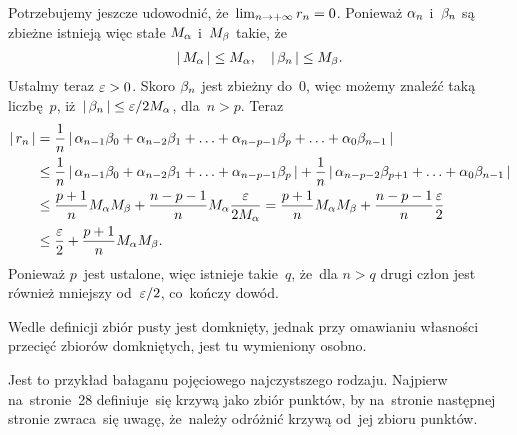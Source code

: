 \documentclass[a4paper,11pt]{article}
\begin{document}
\vspace{\spaceFour}


\start {} Potrzebujemy jeszcze udowodnić,
że~$\lim_{ n \to +\infty } r_{ n } = 0$. Ponieważ $\alpha_{ n }$
i~$\beta_{ n }$ są zbieżne istnieją więc stałe $M_{ \alpha }$ i~$M_{ \beta }$
takie, że
\begin{equation}
  \label{eq:Leja-23}
  \begin{split}
    \left| \,  M_{ \alpha }  \, \right| \leq M_{ \alpha }, \quad \left| \,  \beta_{ n }  \, \right| \leq
    M_{ \beta }.
  \end{split}
\end{equation}
Ustalmy teraz $\varepsilon > 0$. Skoro $\beta_{ n }$ jest zbieżny do~0, więc
możemy znaleźć taką liczbę~$p$,
iż~$\left| \,  \beta_{ n }  \, \right| \leq \varepsilon / 2 M_{ \alpha }$, dla~$n > p$. Teraz
\begin{equation}
  \label{eq:Leja-24}
  \begin{split}
    \left| \,  r_{ n }  \, \right| &= \frac{ 1 }{  n  } \left| \,  \alpha_{ n - 1 } \beta_{ 0 } +
      \alpha_{ n - 2 } \beta_{ 1 } + \ldots + \alpha_{ n - p - 1 } \beta_{ p } +
      \ldots
      + \alpha_{ 0 } \beta_{ n - 1 }  \, \right| \\
    &\leq \frac{ 1 }{  n  } \left| \,  \alpha_{ n - 1 } \beta_{ 0 } + \alpha_{ n - 2 }
      \beta_{ 1 } + \ldots + \alpha_{ n - p - 1 } \beta_{ p }  \, \right| + \frac{ 1 }{  n  }
    \left| \,  \alpha_{ n - p - 2 } \beta_{ p + 1 } + \ldots
      + \alpha_{ 0 } \beta_{ n - 1 }  \, \right| \\
    &\leq \frac{ p + 1 }{ n } M_{ \alpha } M_{ \beta } + \frac{ n - p - 1 }{ n
    } M_{ \alpha } \frac{ \varepsilon }{ 2 M_{ \alpha } } = \frac{ p + 1 }{ n } M_{
      \alpha } M_{ \beta } + \frac{ n - p - 1 }{ n }
    \frac{ \varepsilon }{ 2 } \\
    &\leq \frac{ \varepsilon }{ 2 } + \frac{ p + 1 }{ n } M_{ \alpha } M_{ \beta }.
  \end{split}
\end{equation}
Ponieważ $p$~jest ustalone, więc istnieje takie~$q$, że~dla $n > q$
drugi człon jest również mniejszy od~$\varepsilon / 2$, co~kończy dowód.

\vspace{\spaceFour}


\start {} Wedle definicji zbiór pusty jest domknięty, jednak
przy omawianiu własności przecięć zbiorów domkniętych, jest tu
wymieniony osobno.

\vspace{\spaceFour}


\start {} Jest to przykład bałaganu pojęciowego
najczystszego rodzaju. Najpierw na~stronie~28 definiuje~się krzywą
jako zbiór punktów, by na~stronie następnej stronie zwraca~się uwagę,
że~należy odróżnić krzywą od~jej zbioru punktów.
\end{document}
